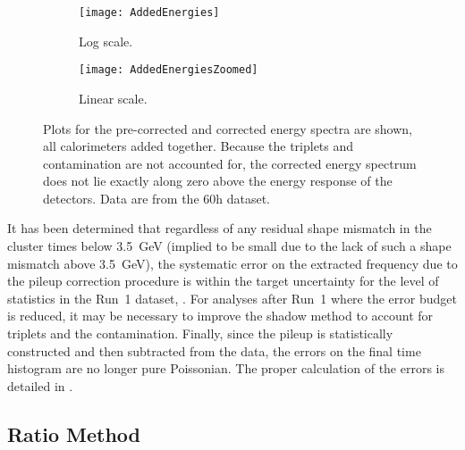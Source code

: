     \begin{figure}
    \centering
        \begin{subfigure}[]{0.45\textwidth}
            \centering
            \texttt{[image: AddedEnergies]}
            \caption{Log scale.}
        \end{subfigure}%
        \hspace{1cm}
        \begin{subfigure}[]{0.45\textwidth}
            \centering
            \texttt{[image: AddedEnergiesZoomed]}
            \caption{Linear scale.}
        \end{subfigure}
    \caption[Non-corrected and pileup corrected cluster energies]{Plots for the pre-corrected and corrected energy spectra are shown, all calorimeters added together. Because the triplets and contamination are not accounted for, the corrected energy spectrum does not lie exactly along zero above the energy response of the detectors. Data are from the 60h dataset.}
    \label{fig:AddedEnergies}
    \end{figure}



It has been determined that regardless of any residual shape mismatch in the cluster times below \SI{3.5}{\GeV} (implied to be small due to the lack of such a shape mismatch above \SI{3.5}{\GeV}), the systematic error on the extracted \wa frequency due to the pileup correction procedure is within the target uncertainty for the level of statistics in the Run~1 dataset, . For analyses after Run~1 where the error budget is reduced, it may be necessary to improve the shadow method to account for triplets and the contamination. Finally, since the pileup is statistically constructed and then subtracted from the data, the errors on the final time histogram are no longer pure Poissonian. The proper calculation of the errors is detailed in .




\subsection{Ratio Method}
\label{sub:ratio_method}

